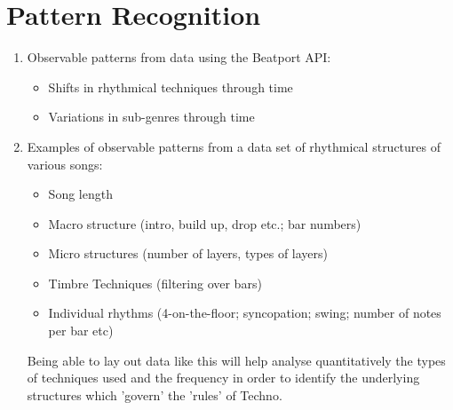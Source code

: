 \documentclass{article}
\begin{document}
\section{Pattern Recognition}
\begin{enumerate}
    \item Observable patterns from data using the Beatport API:
    \begin{itemize}
        \item Shifts in rhythmical techniques through time
        \item Variations in sub-genres through time
    \end{itemize}
    \item Examples of observable patterns from a data set of rhythmical structures of various songs:
    \begin{itemize}
        \item Song length
        \item Macro structure (intro, build up, drop etc.; bar numbers)
        \item Micro structures (number of layers, types of layers)
        \item Timbre Techniques (filtering over bars)
        \item Individual rhythms (4-on-the-floor; syncopation; swing; number of notes per bar etc)
    \end{itemize}
    Being able to lay out data like this will help analyse quantitatively the types of techniques used and the frequency in order to identify the underlying structures which 'govern' the 'rules' of Techno.
\end{enumerate}
\end{document}
